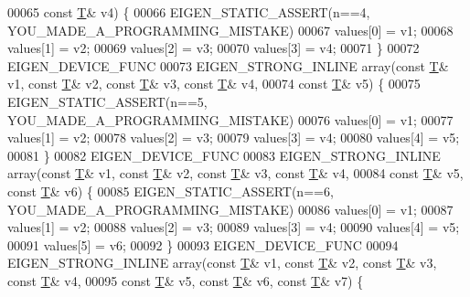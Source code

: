 \begin{DoxyCode}
00065                             \textcolor{keyword}{const} \hyperlink{group___sparse_core___module_class_eigen_1_1_triplet}{T}& v4) \{
00066     EIGEN\_STATIC\_ASSERT(n==4, YOU\_MADE\_A\_PROGRAMMING\_MISTAKE)
00067     values[0] = v1;
00068     values[1] = v2;
00069     values[2] = v3;
00070     values[3] = v4;
00071   \}
00072   EIGEN\_DEVICE\_FUNC
00073   EIGEN\_STRONG\_INLINE array(\textcolor{keyword}{const} \hyperlink{group___sparse_core___module_class_eigen_1_1_triplet}{T}& v1, \textcolor{keyword}{const} \hyperlink{group___sparse_core___module_class_eigen_1_1_triplet}{T}& v2, \textcolor{keyword}{const} \hyperlink{group___sparse_core___module_class_eigen_1_1_triplet}{T}& v3, \textcolor{keyword}{const} \hyperlink{group___sparse_core___module_class_eigen_1_1_triplet}{T}& v4,
00074                             \textcolor{keyword}{const} \hyperlink{group___sparse_core___module_class_eigen_1_1_triplet}{T}& v5) \{
00075     EIGEN\_STATIC\_ASSERT(n==5, YOU\_MADE\_A\_PROGRAMMING\_MISTAKE)
00076     values[0] = v1;
00077     values[1] = v2;
00078     values[2] = v3;
00079     values[3] = v4;
00080     values[4] = v5;
00081   \}
00082   EIGEN\_DEVICE\_FUNC
00083   EIGEN\_STRONG\_INLINE array(\textcolor{keyword}{const} \hyperlink{group___sparse_core___module_class_eigen_1_1_triplet}{T}& v1, \textcolor{keyword}{const} \hyperlink{group___sparse_core___module_class_eigen_1_1_triplet}{T}& v2, \textcolor{keyword}{const} \hyperlink{group___sparse_core___module_class_eigen_1_1_triplet}{T}& v3, \textcolor{keyword}{const} \hyperlink{group___sparse_core___module_class_eigen_1_1_triplet}{T}& v4,
00084                             \textcolor{keyword}{const} \hyperlink{group___sparse_core___module_class_eigen_1_1_triplet}{T}& v5, \textcolor{keyword}{const} \hyperlink{group___sparse_core___module_class_eigen_1_1_triplet}{T}& v6) \{
00085     EIGEN\_STATIC\_ASSERT(n==6, YOU\_MADE\_A\_PROGRAMMING\_MISTAKE)
00086     values[0] = v1;
00087     values[1] = v2;
00088     values[2] = v3;
00089     values[3] = v4;
00090     values[4] = v5;
00091     values[5] = v6;
00092   \}
00093   EIGEN\_DEVICE\_FUNC
00094   EIGEN\_STRONG\_INLINE array(\textcolor{keyword}{const} \hyperlink{group___sparse_core___module_class_eigen_1_1_triplet}{T}& v1, \textcolor{keyword}{const} \hyperlink{group___sparse_core___module_class_eigen_1_1_triplet}{T}& v2, \textcolor{keyword}{const} \hyperlink{group___sparse_core___module_class_eigen_1_1_triplet}{T}& v3, \textcolor{keyword}{const} \hyperlink{group___sparse_core___module_class_eigen_1_1_triplet}{T}& v4,
00095                             \textcolor{keyword}{const} \hyperlink{group___sparse_core___module_class_eigen_1_1_triplet}{T}& v5, \textcolor{keyword}{const} \hyperlink{group___sparse_core___module_class_eigen_1_1_triplet}{T}& v6, \textcolor{keyword}{const} \hyperlink{group___sparse_core___module_class_eigen_1_1_triplet}{T}& v7) \{

\end{DoxyCode}
